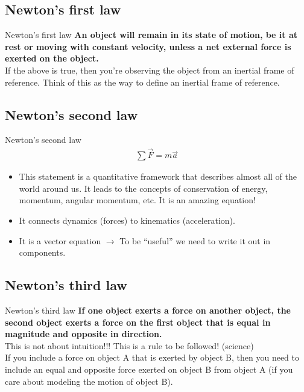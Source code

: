 \documentclass[aspectratio=169,
hyperref={colorlinks,urlcolor=blue}
]{beamer}
\begin{document}




\subsection{Newton's first law}
\label{subsec:newtonsfirstlaw}
\begin{frame}{Newton's first law}
\textbf{An object will remain in its state of motion, be it at rest or moving with constant velocity, unless a net external force is exerted on the object.}\\
\vfill
If the above is true, then you're observing the object from an inertial frame of reference. Think of this as the way to define an inertial frame of reference.
\end{frame}


\subsection{Newton's second law}
\label{subsec:newtonssecondlaw}
\begin{frame}{Newton's second law}
\begin{align*}
\sum \vec F = m\vec a
\end{align*}
\begin{itemize}
\item This statement is a quantitative framework that describes almost all of the world around us. It leads to the concepts of conservation of energy, momentum, angular momentum, etc. It is an amazing equation!
\item It connects dynamics (forces) to kinematics (acceleration).
\item It is a vector equation $\rightarrow$ To be ``useful'' we need to write it out in components. 
\end{itemize}
\end{frame}

\subsection{Newton's third law}
\label{subsec:newtonsthirdlaw}
\begin{frame}{Newton's third law}
\textbf{If one object exerts a force on another object, the second object
exerts a force on the first object that is equal in magnitude and
opposite in direction.}\\
\vfill
This is not about intuition!!! \textcolor{myred}{This is a rule to be followed!} (science)\\
\vfill
If you include a force on object A that is exerted by object B, then you need to include an equal and opposite force exerted on object B from object A (if you care about modeling the motion of object B).
\end{frame}
\end{document}
